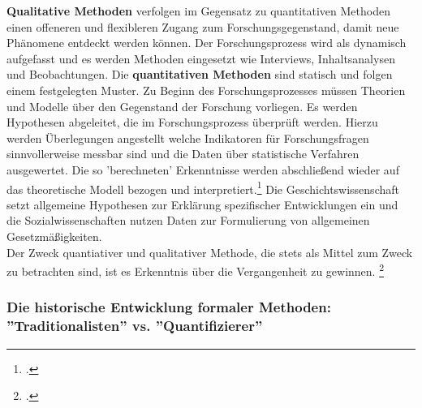 \documentclass[12pt,a4paper]{article}
\begin{document}
\textbf{Qualitative Methoden} verfolgen im Gegensatz zu quantitativen Methoden einen offeneren und flexibleren Zugang zum Forschungsgegenstand, damit neue Phänomene entdeckt werden können. Der Forschungsprozess wird als dynamisch aufgefasst und es werden Methoden eingesetzt wie Interviews, Inhaltsanalysen und Beobachtungen. Die \textbf{quantitativen Methoden} sind statisch und folgen einem festgelegten Muster. Zu Beginn des Forschungsprozesses müssen Theorien und Modelle über den Gegenstand der Forschung vorliegen. Es werden Hypothesen abgeleitet, die im Forschungsprozess überprüft werden. Hierzu werden Überlegungen angestellt welche Indikatoren für Forschungsfragen sinnvollerweise messbar sind und die Daten über statistische Verfahren ausgewertet. Die so 'berechneten' Erkenntnisse werden abschließend wieder auf das theoretische Modell bezogen und interpretiert.\footcite[][S.309–329]{wolf1995qualitative} Die Geschichtswissenschaft setzt allgemeine Hypothesen zur Erklärung spezifischer Entwicklungen ein und die Sozialwissenschaften nutzen Daten zur Formulierung von allgemeinen Gesetzmäßigkeiten.
\\
Der Zweck quantiativer und qualitativer Methode, die stets als Mittel zum Zweck zu betrachten sind, ist es Erkenntnis über die Vergangenheit zu gewinnen. \footcite[][S.203-206]{jarausch1985quantitative}

\subsubsection{Die historische Entwicklung formaler Methoden: ''Traditionalisten'' vs. ''Quantifizierer'' }
\end{document}
